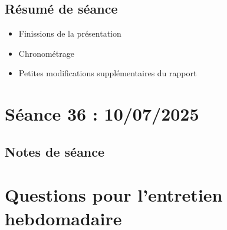 \documentclass[12pt]{article}
\begin{document}
	\subsection{Résumé de séance}
	\begin{itemize}
		\item Finissions de la présentation
		\item Chronométrage
		\item Petites modifications supplémentaires du rapport
	\end{itemize}
	
	
	\section{Séance 36 : 10/07/2025}
	\subsection{Notes de séance}
	
	
	
	\section{Questions pour l'entretien hebdomadaire}
\end{document}

